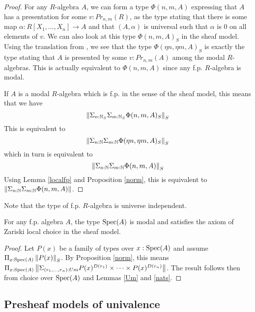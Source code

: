    \begin{proof}
          For any $R$-algebra $A$, we can form a type $\Phi(n,m,A)$ expressing that $A$ has a presentation for some $v:Pr_{n,m}(R)$,
    as the type stating that there is some map $\alpha:R[X_1,\dots,X_n]\rightarrow A$ and that $(A,\alpha)$ is universal such that
    $\alpha$ is $0$ on all elements of $v$. We can also look at this type $\Phi(n,m,A)_S$ in the sheaf model. Using the translation
    from \cite{Quirin16,CRS21}, we see that the type $\Phi(\eta n,\eta m,A)_S$ is exactly the type stating that $A$ is presented by
    some $v:Pr_{n,m}(A)$ among the modal $R$-algebras. This is actually equivalent to $\Phi(n,m,A)$ since any f.p. $R$-algebra is modal.

     If $A$ is a modal $R$-algebra which is f.p. in the sense of the sheaf model, this means that we have
     $$\left\lVert \Sigma_{n:\mathbb{N}_S}\Sigma_{m:\mathbb{N}_S}\Phi(n,m,A)_S \right\rVert_S$$
     This is equivalent to
     $$\left\lVert \Sigma_{n:\mathbb{N}}\Sigma_{m:\mathbb{N}}\Phi(\eta n,\eta m,A)_S \right\rVert_S$$
     which in turn is equivalent to
     $$\left\lVert \Sigma_{n:\mathbb{N}}\Sigma_{m:\mathbb{N}}\Phi(n,m,A) \right\rVert_S$$
     Using Lemma \ref{localfp} and Proposition \ref{norm}, this is equivalent to $\left\lVert \Sigma_{n:\mathbb{N}}\Sigma_{m:\mathbb{N}}\Phi(n,m,A) \right\rVert$.
    \end{proof}

     Note that the type of f.p. $R$-algebra is universe independent.

    \begin{proposition}
      For any f.p. algebra $A$, the type $\operatorname{Spec}(A)$ is modal and satisfies the axiom of Zariski local choice in
      the sheaf model.
    \end{proposition}
    
    \begin{proof}
      Let $P(x)$ be a family of types over $x:\operatorname{Spec}(A)$ and assume $\Pi_{x:\operatorname{Spec}(A)}\left\lVert P(x) \right\rVert_S$. By Proposition \ref{norm},
      this means $\Pi_{x:\operatorname{Spec}(A)}\left\lVert \Sigma_{(r_1,\dots,r_n):Um}P(x)^{D(r_1)}\times\dots\times P(x)^{D(r_n)} \right\rVert$. The result follows
      then from choice over $\operatorname{Spec}(A)$ and Lemmas \ref{Um} and \ref{nats}.
    \end{proof}      


    \subsection{Presheaf models of univalence}

